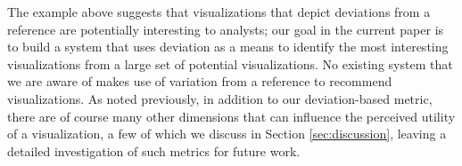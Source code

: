 




\noindent The example above suggests that visualizations that depict
deviations from a reference are potentially interesting to analysts;
our goal in the current paper is to build a system 
that uses deviation as a means to identify
the most interesting visualizations from a large set of potential visualizations.
No existing system that we are aware of makes use of variation from a reference
to recommend visualizations.  
As noted previously, in addition to our deviation-based metric,
there are of course many other dimensions 
that can influence the perceived utility of a
visualization, a few of which we discuss in Section
\ref{sec:discussion}, leaving a detailed investigation of such metrics
for future work.

